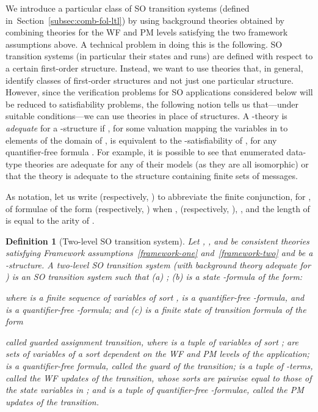 \documentclass[conference]{IEEEtran}
\newtheorem{definition}{Definition}
\newcommand{\close}{\IEEEQEDclosed}
\newcommand{\secref}[1]{Section~\ref{#1}}
\begin{document}
We introduce a particular class of SO transition systems (defined
in~\secref{subsec:comb-fol-ltl}) by using background theories obtained
by combining theories for the WF and PM levels satisfying the two
framework assumptions above.  A technical problem in doing this is the
following.  SO transition systems (in particular their states and
runs) are defined with respect to a certain first-order structure.  Instead,
we want to use theories that, in general, identify classes of
first-order structures and not just one particular structure.
However, since the verification problems for SO applications
considered below will be reduced to satisfiability problems, the
following notion tells us that---under suitable conditions---we can
use theories in place of structures.  A -theory  is
\emph{adequate} for a -structure  if 
, for some valuation 
mapping the variables in  to elements of the domain of
, is equivalent to the -satisfiability of
, for any quantifier-free formula
.  For example, it is possible to see that
enumerated data-type theories are adequate for any of their models (as
they are all isomorphic) or that the theory
 is adequate to the structure
containing finite sets of messages.  

As notation, let us write  (respectively, ) to abbreviate the finite conjunction, for , of formulae of the form  (respectively, ) when ,  (respectively, ), , and the length of  is equal to the arity of .
  
\begin{definition}[Two-level SO transition system]
  Let , , and  be consistent
  theories satisfying Framework assumptions~\ref{framework-one} and~\ref{framework-two} 
  and  be
  a -structure.  A \emph{two-level SO
    transition system (with background theory  
    adequate for )} is an SO transition system
   such that (a)
  ; (b)  is a state
  -formula of the form:
  
  where  is a finite sequence of variables of sort
  ,  is a quantifier-free
  -formula, and 
  is a quantifier-free
  -formula; and (c)
   is a finite state of transition formula of the form
  
  called \emph{guarded assignment transition}, where 
  is a tuple of variables of sort ;  are sets of variables of a sort dependent on the WF
  and PM levels of the application;  is a quantifier-free formula,
  called the \emph{guard} of the transition;  is a
  tuple of -terms,
  called the \emph{WF updates} of the transition, whose sorts are
  pairwise equal to those of the state variables in ;
  and  is a tuple of quantifier-free
  -formulae, called the \emph{PM updates} of the transition. 
  \hfill\close
\end{definition}
\end{document}
